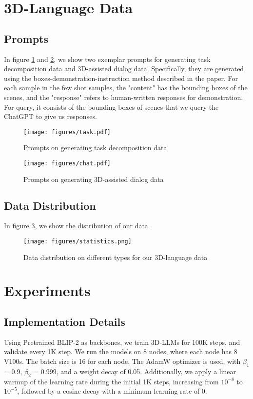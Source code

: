 
\appendix
\setcounter{section}{0}


\section{3D-Language Data}
\subsection{Prompts}
In figure \ref{fig:prompt1} and \ref{fig:prompt2}, we show two exemplar prompts for generating task decomposition data and 3D-assisted dialog data. Specifically, they are generated using the boxes-demonstration-instruction method described in the paper. For each sample in the few shot samples, the "content" has the bounding boxes of the scenes, and the "response" refers to human-written responses for demonstration. For query, it consists of the bounding boxes of scenes that we query the ChatGPT to give us responses. 
\begin{figure}[htbp]
    \centering
    \vspace{-2em}
    \texttt{[image: figures/task.pdf]}
    \caption{Prompts on generating task decomposition data}
    \label{fig:prompt1}
    \vspace{-2em}
\end{figure}
\begin{figure}[htbp]
    \centering
    \texttt{[image: figures/chat.pdf]}
    \caption{Prompts on generating 3D-assisted dialog data}
    \label{fig:prompt2}
\end{figure}

\subsection{Data Distribution}
In figure \ref{fig:data}, we show the distribution of our data.
\begin{figure}[htbp]
    \centering
    \texttt{[image: figures/statistics.png]}
    \caption{Data distribution on different types for our 3D-language data}
    \label{fig:data}
\end{figure}

\section{Experiments}
\subsection{Implementation Details}
Using Pretrained BLIP-2 as backbones, we train 3D-LLMs for 100K steps, and validate every 1K step. We run the models on 8 nodes, where each node has 8 V100s. The batch size is 16 for each node.  The AdamW optimizer is used, with $\beta_1$ = 0.9,
$\beta_2$ = 0.999, and a weight decay of 0.05. Additionally, we apply a linear warmup of the learning
rate during the initial 1K steps, increasing from $10^{-8}$ to $10^{-5}$, followed by a cosine decay with a minimum learning rate of 0.

